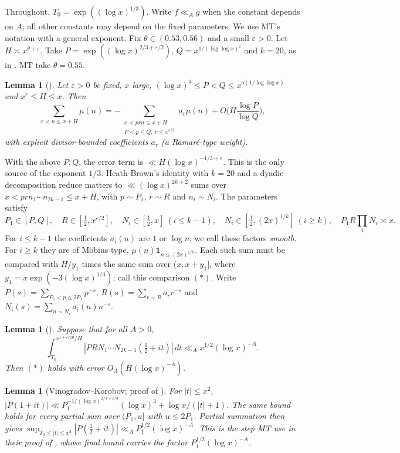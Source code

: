 \documentclass[11pt]{amsart}
\newtheorem{lemma}[theorem]{Lemma}
\theoremstyle{definition}
\theoremstyle{remark}
\newcommand{\e}{\varepsilon}
\begin{document}
Throughout, $T_0=\exp((\log x)^{1/3})$. Write $f\ll_A g$ when the constant depends on $A$; all other constants may depend on the fixed
parameters. We use MT's notation with a general exponent. Fix $\theta\in(0.53,0.56)$ and a small $\e>0$. Let $H\asymp
x^{\theta+\e}$. Take $P=\exp((\log x)^{2/3+\e/2})$, $Q=x^{1/(\log\log x)^2}$ and $k=20$, as in \cite[\S4.1]{MT}. MT take $\theta=0.55$.

\begin{lemma}[{\cite[Lemma~3.1]{MT}}]\label{lem:ramare}
Let $\e>0$ be fixed, $x$ large, $(\log x)^4\le P<Q\le x^{o(1/\log\log x)}$ and $x^{\e}\le H\le x$. Then
\[
\sum_{x<n\le x+H}\mu(n)=-\!\!\sum_{\substack{x<prn\le x+H\\ P<p\le Q,\ r\le x^{\e/2}}}\!\! a_r\mu(n)+O\Big(H\frac{\log P}{\log Q}\Big),
\]
with explicit divisor-bounded coefficients $a_r$ (a Ramar\'e-type weight).
\end{lemma}

With the above $P,Q$, the error term is $\ll H(\log x)^{-1/3+\e}$. This is the only source of the exponent $1/3$.
Heath-Brown's identity with $k=20$ and a dyadic decomposition \cite[\S4.1]{MT} reduce matters to $\ll(\log x)^{2k+2}$ sums over
$x<prn_1\cdots n_{2k-1}\le x+H$, with $p\sim P_1$, $r\sim R$ and $n_i\sim N_i$. The parameters satisfy
\begin{equation}\label{eq:config}
P_1\in[P,Q],\quad R\in[\tfrac12,x^{\e/2}],\quad N_i\in[\tfrac12,x]\ (i\le k-1),\quad N_i\in[\tfrac12,(2x)^{1/k}]\ (i\ge k),\quad P_1R\textstyle\prod_iN_i\asymp x.
\end{equation}
For $i\le k-1$ the coefficients $a_i(n)$ are $1$ or $\log n$; we call these factors \emph{smooth}. For $i\ge k$ they are of M\"obius type,
$\mu(n)\mathbf 1_{n\le(2x)^{1/k}}$. Each such sum must be compared with $H/y_1$ times the same sum over $(x,x+y_1]$, where
$y_1=x\exp(-3(\log x)^{1/3})$; call this comparison $(\ast)$. Write
$P(s)=\sum_{P_1<p\le 2P_1}p^{-s}$, $R(s)=\sum_{r\sim R}a_rr^{-s}$ and $N_i(s)=\sum_{n\sim N_i}a_i(n)n^{-s}$.

\begin{lemma}[{\cite[Lemma~4.2]{MT}}]\label{lem:perron}
Suppose that for all $A>0$,
\begin{equation}\label{eq:L1}
\int_{T_0}^{x^{1+\e/10}/H}|P R N_1\cdots N_{2k-1}(\tfrac12+it)|\,dt\ll_A x^{1/2}(\log x)^{-A}.
\end{equation}
Then $(\ast)$ holds with error $O_A(H(\log x)^{-A})$.
\end{lemma}

\begin{lemma}[Vinogradov--Korobov; proof of {\cite[Lemma~4.3]{MT}}]\label{lem:VK}
For $|t|\le x^2$, $|P(1+it)|\ll P_1^{-1/(\log x)^{2/3+\e/3}}(\log x)^3+\log x/(|t|+1)$. The same bound holds for every
partial sum over $(P_1,u]$ with $u\le2P_1$. Partial summation then gives $\sup_{T_0\le|t|\le x^2}|P(\frac12+it)|\ll_A P_1^{1/2}(\log x)^{-A}$.
This is the step MT use in their proof of \cite[Lemma~4.3]{MT}, whose final bound carries the factor $P_1^{1/2}(\log x)^{-A}$.
\end{lemma}
\end{document}

